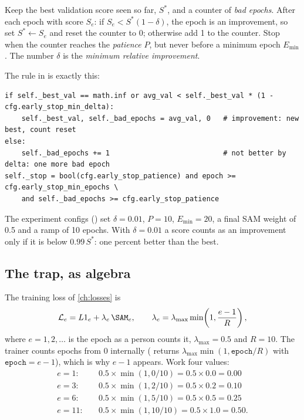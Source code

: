 \begin{definition}
Keep the best validation score seen so far, $S^\ast$, and a counter of \emph{bad epochs}. After each epoch with
score $S_e$: if $S_e < S^\ast(1 - \delta)$, the epoch is an improvement, so set $S^\ast \gets S_e$ and reset the
counter to 0; otherwise add 1 to the counter. Stop when the counter reaches the \emph{patience} $P$, but never before
a minimum epoch $E_{\min}$. The number $\delta$ is the \emph{minimum relative improvement}.
\end{definition}

The rule in  is exactly this:
\begin{lstlisting}
if self._best_val == math.inf or avg_val < self._best_val * (1 - cfg.early_stop_min_delta):
    self._best_val, self._bad_epochs = avg_val, 0   # improvement: new best, count reset
else:
    self._bad_epochs += 1                           # not better by delta: one more bad epoch
self._stop = bool(cfg.early_stop_patience) and epoch >= cfg.early_stop_min_epochs \
    and self._bad_epochs >= cfg.early_stop_patience
\end{lstlisting}
The experiment configs () set $\delta = 0.01$,
$P = 10$, $E_{\min} = 20$, a final SAM weight of 0.5 and a ramp of 10 epochs.\tbrk{}
With $\delta = 0.01$ a score counts as an improvement only if it is below $0.99\,S^\ast$: one percent better than the
best.

\subsection{The trap, as algebra}

The training loss of \cref{ch:losses} is
\begin{equation}\label{eq:pretrain:trainloss}
  \mathcal{L}_e = L1_e + \lambda_e\,\SAM_e, \qquad \lambda_e = \lambda_{\max}\min\!\left(1, \frac{e-1}{R}\right),
\end{equation}
where $e = 1, 2, \dots$ is the epoch as a person counts it, $\lambda_{\max} = 0.5$ and $R = 10$. The trainer counts
epochs from 0 internally (\code{_get_sam_weight(epoch)} returns $\lambda_{\max}\min(1, \texttt{epoch}/R)$ with
$\texttt{epoch} = e - 1$), which is why $e - 1$ appears. Work four values:
\begin{align*}
  e = 1:&\quad 0.5 \times \min(1, 0/10) = 0.5 \times 0.0 = 0.00\\
  e = 3:&\quad 0.5 \times \min(1, 2/10) = 0.5 \times 0.2 = 0.10\\
  e = 6:&\quad 0.5 \times \min(1, 5/10) = 0.5 \times 0.5 = 0.25\\
  e = 11:&\quad 0.5 \times \min(1, 10/10) = 0.5 \times 1.0 = 0.50.
\end{align*}

